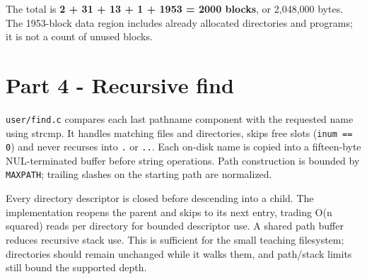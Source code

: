 \begin{table}[H]\end{table}

The total is \textbf{2 + 31 + 13 + 1 + 1953 = 2000 blocks}, or 2,048,000 bytes. The 1953-block data region includes already allocated directories and programs; it is not a count of unused blocks.

\section{Part 4 - Recursive find}

\texttt{user/\allowbreak{}find.c} compares each last pathname component with the requested name using strcmp. It handles matching files and directories, skips free slots (\texttt{inum == 0}) and never recurses into \texttt{.} or \texttt{..}. Each on-disk name is copied into a fifteen-byte NUL-terminated buffer before string operations. Path construction is bounded by \texttt{MAXPATH}; trailing slashes on the starting path are normalized.

Every directory descriptor is closed before descending into a child. The implementation reopens the parent and skips to its next entry, trading O(n squared) reads per directory for bounded descriptor use. A shared path buffer reduces recursive stack use. This is sufficient for the small teaching filesystem; directories should remain unchanged while it walks them, and path/stack limits still bound the supported depth.


